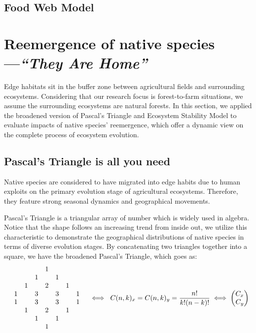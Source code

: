 \documentclass[12pt]{article}
\begin{document}
	\subsection{Food Web Model}
	
	
	\section{Reemergence of native species---\textit{``They Are Home''}}
	\hspace{2em}Edge habitats sit in the buffer zone between agricultural fields and surrounding ecosystems. Considering that our research focus is forest-to-farm situations, we assume the surrounding ecosystems are natural forests. In this section, we applied the broadened version of Pascal's Triangle and Ecosystem Stability Model to evaluate impacts of native species' reemergence, which offer a dynamic view on the complete process of ecosystem evolution.
	\subsection{Pascal's Triangle is all you need}
	\hspace{2em}Native species are considered to have migrated into edge habits due to human exploits on the primary evolution stage of agricultural ecosystems. Therefore, they feature strong seasonal dynamics and geographical movements.
	
	Pascal's Triangle is a triangular array of number which is widely used in algebra. Notice that the shape follows an increasing trend from inside out, we utilize this characteristic to demonstrate the geographical distributions of native species in terms of diverse evolution stages. By concatenating two triangles together into a square, we have the broadened Pascal's Triangle, which goes as:
	\begin{equation}
		\begin{matrix}
			& & & &1 & & & & \\
			& & &1&  &1& & & \\
			& &1& &2 & &1 & & \\
			&1& &3&  &3&  &1 & \\ 
			&1& &3&  &3&  &1 & \\ 
			& &1& &2 & &1 & & \\
			& & &1&  &1& & & \\
			& & & &1 & & & & \\
		\end{matrix}\hspace{0.2em} \iff\hspace{0.3em}C(n,k)_x=C(n,k)_y=\frac{n!}{k!(n-k)!}\iff\begin{pmatrix}
			C_x \\C_y
		\end{pmatrix}
	\end{equation}
	
\end{document}
